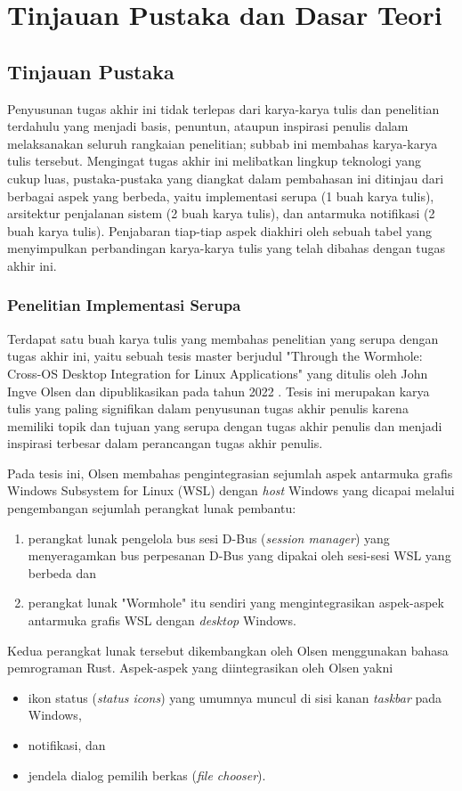 \chapter{Tinjauan Pustaka dan Dasar Teori}

\section{Tinjauan Pustaka}

Penyusunan tugas akhir ini tidak terlepas dari karya-karya tulis dan penelitian terdahulu yang menjadi basis, penuntun, ataupun inspirasi penulis dalam melaksanakan seluruh rangkaian penelitian; subbab ini membahas karya-karya tulis tersebut. Mengingat tugas akhir ini melibatkan lingkup teknologi yang cukup luas, pustaka-pustaka yang diangkat dalam pembahasan ini ditinjau dari berbagai aspek yang berbeda, yaitu implementasi serupa (1 buah karya tulis), arsitektur penjalanan sistem (2 buah karya tulis), dan antarmuka notifikasi (2 buah karya tulis). Penjabaran tiap-tiap aspek diakhiri oleh sebuah tabel yang menyimpulkan perbandingan karya-karya tulis yang telah dibahas dengan tugas akhir ini.

\subsection{Penelitian Implementasi Serupa}

Terdapat satu buah karya tulis yang membahas penelitian yang serupa dengan tugas akhir ini, yaitu sebuah tesis master berjudul "Through the Wormhole: Cross-OS Desktop Integration for Linux Applications" yang ditulis oleh John Ingve Olsen dan dipublikasikan pada tahun 2022 \cite{olsen-2022-through-the-wormhole}. Tesis ini merupakan karya tulis yang paling signifikan dalam penyusunan tugas akhir penulis karena memiliki topik dan tujuan yang serupa dengan tugas akhir penulis dan menjadi inspirasi terbesar dalam perancangan tugas akhir penulis.

Pada tesis ini, Olsen membahas pengintegrasian sejumlah aspek antarmuka grafis Windows Subsystem for Linux (WSL) dengan \textit{host} Windows yang dicapai melalui pengembangan sejumlah perangkat lunak pembantu:
\begin{enumerate}
    \item perangkat lunak pengelola bus sesi D-Bus (\textit{session manager}) yang menyeragamkan bus perpesanan D-Bus yang dipakai oleh sesi-sesi WSL yang berbeda dan
    \item perangkat lunak "Wormhole" itu sendiri yang mengintegrasikan aspek-aspek antarmuka grafis WSL dengan \textit{desktop} Windows.
\end{enumerate}
Kedua perangkat lunak tersebut dikembangkan oleh Olsen menggunakan bahasa pemrograman Rust. Aspek-aspek yang diintegrasikan oleh Olsen yakni
\begin{itemize}
    \item ikon status (\textit{status icons}) yang umumnya muncul di sisi kanan \textit{taskbar} pada Windows,
    \item notifikasi, dan
    \item jendela dialog pemilih berkas (\textit{file chooser}).
\end{itemize}

